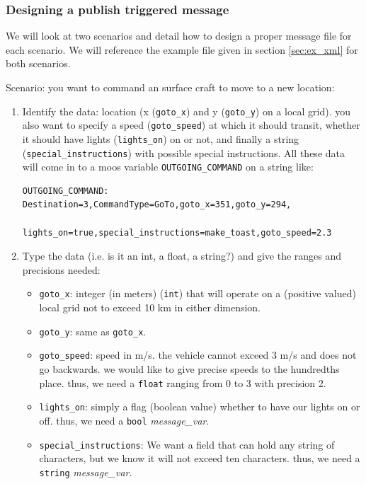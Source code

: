 \documentclass[11pt, letterpaper, oneside]{memoir}
\begin{document}
\subsubsection{Designing a publish triggered message}  \label{sec:design}
We will look at two scenarios and detail how to design a proper message file for each scenario. We will reference the example file given in section \ref{sec:ex_xml} for both scenarios.

Scenario: you want to command an surface craft to move to a new location:
\begin{enumerate}
\item Identify the data: location (x (\verb|goto_x|) and y (\verb|goto_y|) on a local grid). you also want to specify a speed (\verb|goto_speed|) at which it should transit, whether it should have lights (\verb|lights_on|) on or not, and finally a string (\verb|special_instructions|) with possible special instructions. All these data will come in to a moos variable \verb|OUTGOING_COMMAND| on a string like: 
\begin{small}
\begin{verbatim}
OUTGOING_COMMAND: Destination=3,CommandType=GoTo,goto_x=351,goto_y=294,
                  lights_on=true,special_instructions=make_toast,goto_speed=2.3
\end{verbatim}
\end{small}
\item Type the data (i.e. is it an int, a float, a string?) and give the ranges and precisions needed: 
\begin{itemize}
\item \verb|goto_x|: integer (in meters) (\verb|int|) that will operate on a (positive valued) local grid not to exceed 10 km in either dimension. 
\item \verb|goto_y|: same as \verb|goto_x|.
\item \verb|goto_speed|: speed in m/s. the vehicle cannot exceed 3 m/s and does not go backwards. we would like to give precise speeds to the hundredths place. thus, we need a \verb|float| ranging from 0 to 3 with precision 2.
\item \verb|lights_on|: simply a flag (boolean value) whether to have our lights on or off. thus, we need a \verb|bool| \textit{message\_var}.
\item \verb|special_instructions|: We want a field that can hold any string of characters, but we know it will not exceed ten characters. thus, we need a \verb|string| \textit{message\_var}.
\end{itemize}

\end{enumerate}
\end{document}
